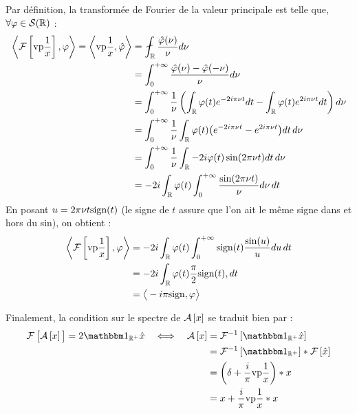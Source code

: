 \begin{annexe}
\begin{demo}
	Par définition, la transformée de Fourier de la valeur principale est telle que,\\ $\forall \varphi\in\mathcal{S}(\mathbb{R})$ :
	\begin{align*}
		\left\langle \mathcal{F} \left[\vpC \right], \varphi \right\rangle = \left\langle \vpC, \hat{\varphi} \right\rangle 
		&= \fint_\R \frac{\hat{\varphi}(\nu)}{\nu} d\nu \\
		&= \int_0^{+\infty} \frac{\hat{\varphi}(\nu) - \hat{\varphi}(-\nu)}{\nu} d\nu \\
		&= \int_0^{+\infty} \frac{1}{\nu} \left( \int_\R\varphi(t)e^{-2i\pi \nu t}dt - \int_\R\varphi(t)e^{2i\pi \nu t}dt \right)d\nu \\
		&= \int_0^{+\infty} \frac{1}{\nu}\int_\R\varphi(t)\big(e^{-2i\pi \nu t} - e^{2i\pi \nu t}\big)dt\, d\nu \\
		&= \int_0^{+\infty} \frac{1}{\nu}\int_\R-2i\varphi(t)\sin(2\pi \nu t)dt\, d\nu \\
		&= -2i\int_\R\varphi(t)\int_0^{+\infty} \frac{\sin(2\pi \nu t)}{\nu}d\nu\, dt
	\end{align*}
	En posant $u=2\pi\nu t\text{\normalfont sign}(t)$ (le signe de $t$ assure que l'on ait le même signe dans et hors du sin), on obtient :
	\begin{align*}
		\left\langle \mathcal{F} \left[\text{\normalfont vp} \frac{1}{x} \right], \varphi \right\rangle &= -2i\int_{\mathbb{R}}\varphi(t)\int_0^{+\infty} \text{\normalfont sign}(t)\frac{\sin(u)}{u}du\, dt \\
		&= -2i\int_{\mathbb{R}}\varphi(t)\frac{\pi}{2}\text{\normalfont sign}(t), dt \\
		&= \big\langle -i\pi\text{\normalfont sign}, \varphi \big\rangle
	\end{align*}
\end{demo}

Finalement, la condition sur le spectre de $\mathcal{A}\left[x\right]$ se traduit bien par :
\begin{align*}
	\Fou{\SA{x}\big.} = 2\one_{\R^+}\fou{x}\quad \Llr\quad \SA{x} &= \iFou{\one_{\R^+}\fou{x}} \\
	&= \iFou{\one_{\R^+}} * \Fou{\fou{x}} \\
	&= \left( \delta + \frac{i}{\pi} \vpC \right) * x \\
	&= x + \frac{i}{\pi} \vpC  * x
\end{align*}
	
\end{annexe}